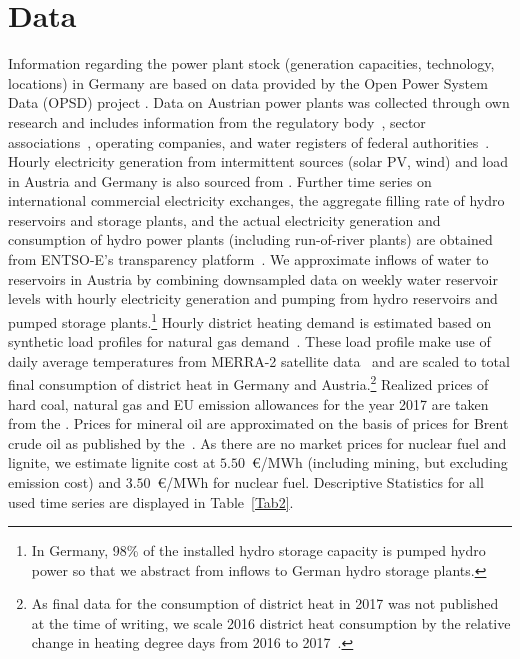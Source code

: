 \documentclass[11pt,a4paper]{article}
\begin{document}
\section{Data}
Information regarding the power plant stock (generation capacities, technology, locations) in Germany are based on data provided by the Open Power System Data (OPSD) project \citep{OPSD2018a}.
Data on Austrian power plants was collected through own research and includes information from the regulatory body~\citep{EControl2003}, sector associations~\citep{OeEn2017}, operating companies, and water registers of federal authorities~\citep{LandVorarlberg2018, LandTirol2018}.
Hourly electricity generation from intermittent sources (solar PV, wind) and load in Austria and Germany is also sourced from \citet{OPSD2018b}. 
Further time series on international commercial electricity exchanges, the aggregate filling rate of hydro reservoirs and storage plants, and the actual electricity generation and consumption of hydro power plants (including run-of-river plants) are obtained from ENTSO-E's transparency platform~\citep{ENTSOE2018}.
We approximate inflows of water to reservoirs in Austria by combining downsampled data on weekly water reservoir levels with hourly electricity generation and pumping from hydro reservoirs and pumped storage plants.\footnote{In Germany, 98\% of the installed hydro storage capacity is pumped hydro power so that we abstract from inflows to German hydro storage plants.}
Hourly district heating demand is estimated based on synthetic load profiles for natural gas demand~\citep{Almbauer2009}.
These load profile make use of daily average temperatures from MERRA-2 satellite data~\citep{GMAO2015} and are scaled to total final consumption of district heat in Germany and Austria.\footnote{As final data for the consumption of district heat in 2017 was not published at the time of writing, we scale 2016 district heat consumption by the relative change in heating degree days from 2016 to 2017~\citep{AGEB2018a, OeStat2018}.}
Realized prices of hard coal, natural gas and EU emission allowances for the year 2017 are taken from the \citet{EEX2019}.
Prices for mineral oil are approximated on the basis of prices for Brent crude oil as published by the~\citet{EIA2018}.
As there are no market prices for nuclear fuel and lignite, we estimate lignite cost at $5.50$~\euro{}/MWh (including mining, but excluding emission cost) and $3.50$~\euro{}/MWh for nuclear fuel.
Descriptive Statistics for all used time series are displayed in Table~\ref{Tab2}.
\end{document}

